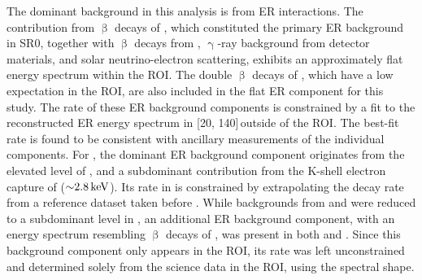 \documentclass[
    reprint,
    superscriptaddress,
    aps, prl,
    amsmath,amssymb,
    twocolumn,
    showkeys,
    floatfix,
    nofootinbib,
]{revtex4-2}
\begin{document}
The dominant background in this analysis is from ER interactions.
The contribution from $\upbeta$ decays of , which constituted the primary ER background in SR0, together with $\upbeta$ decays from , $\upgamma$-ray background from detector materials, and solar neutrino-electron scattering, exhibits an approximately flat energy spectrum within the ROI.
The double $\upbeta$ decays of , which have a low expectation in the ROI, are also included in the flat ER component for this study.
The rate of these ER background components is constrained by a fit to the reconstructed ER energy spectrum in [20, 140]\,\kever outside of the ROI. The best-fit rate is found to be consistent with ancillary measurements of the individual components.
For \sronea, the dominant ER background component originates from the elevated level of , and a subdominant contribution from the K-shell electron capture of  ($\SI{\sim2.8}{\kilo\electronvolt}$).
Its rate in \sronea is constrained by extrapolating the  decay rate from a reference dataset taken before \sronea.
While backgrounds from  and  were reduced to a subdominant level in \sroneb, an additional ER background component, with an energy spectrum resembling $\upbeta$ decays of , was present in both \sronea and \sroneb.
Since this background component only appears in the ROI, its rate was left unconstrained and determined solely from the science data in the ROI, using the  spectral shape.
\end{document}
